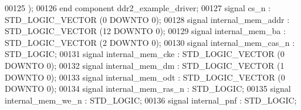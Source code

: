 \begin{DoxyCode}
{00125       );
00126   \textcolor{keywordflow}{end} \textcolor{keywordflow}{component} \textcolor{vhdlchar}{ddr2_example_driver};
00127                 \textcolor{keywordflow}{signal} \textcolor{vhdlchar}{cs_n} \textcolor{vhdlchar}{:}  \textcolor{comment}{STD\_LOGIC\_VECTOR} \textcolor{vhdlchar}{(}\textcolor{vhdllogic}{}\textcolor{vhdllogic}{0} \textcolor{keywordflow}{DOWNTO} \textcolor{vhdllogic}{}\textcolor{vhdllogic}{0}\textcolor{vhdlchar}{)};
00128                 \textcolor{keywordflow}{signal} \textcolor{vhdlchar}{internal_mem_addr} \textcolor{vhdlchar}{:}  \textcolor{comment}{STD\_LOGIC\_VECTOR} \textcolor{vhdlchar}{(}\textcolor{vhdllogic}{}\textcolor{vhdllogic}{12} \textcolor{keywordflow}{DOWNTO} \textcolor{vhdllogic}{}\textcolor{vhdllogic}{0}\textcolor{vhdlchar}{)};
00129                 \textcolor{keywordflow}{signal} \textcolor{vhdlchar}{internal_mem_ba} \textcolor{vhdlchar}{:}  \textcolor{comment}{STD\_LOGIC\_VECTOR} \textcolor{vhdlchar}{(}\textcolor{vhdllogic}{}\textcolor{vhdllogic}{2} \textcolor{keywordflow}{DOWNTO} \textcolor{vhdllogic}{}\textcolor{vhdllogic}{0}\textcolor{vhdlchar}{)};
00130                 \textcolor{keywordflow}{signal} \textcolor{vhdlchar}{internal_mem_cas_n} \textcolor{vhdlchar}{:}  \textcolor{comment}{STD\_LOGIC};
00131                 \textcolor{keywordflow}{signal} \textcolor{vhdlchar}{internal_mem_cke} \textcolor{vhdlchar}{:}  \textcolor{comment}{STD\_LOGIC\_VECTOR} \textcolor{vhdlchar}{(}\textcolor{vhdllogic}{}\textcolor{vhdllogic}{0} \textcolor{keywordflow}{DOWNTO} \textcolor{vhdllogic}{}\textcolor{vhdllogic}{0}\textcolor{vhdlchar}{)};
00132                 \textcolor{keywordflow}{signal} \textcolor{vhdlchar}{internal_mem_dm} \textcolor{vhdlchar}{:}  \textcolor{comment}{STD\_LOGIC\_VECTOR} \textcolor{vhdlchar}{(}\textcolor{vhdllogic}{}\textcolor{vhdllogic}{1} \textcolor{keywordflow}{DOWNTO} \textcolor{vhdllogic}{}\textcolor{vhdllogic}{0}\textcolor{vhdlchar}{)};
00133                 \textcolor{keywordflow}{signal} \textcolor{vhdlchar}{internal_mem_odt} \textcolor{vhdlchar}{:}  \textcolor{comment}{STD\_LOGIC\_VECTOR} \textcolor{vhdlchar}{(}\textcolor{vhdllogic}{}\textcolor{vhdllogic}{0} \textcolor{keywordflow}{DOWNTO} \textcolor{vhdllogic}{}\textcolor{vhdllogic}{0}\textcolor{vhdlchar}{)};
00134                 \textcolor{keywordflow}{signal} \textcolor{vhdlchar}{internal_mem_ras_n} \textcolor{vhdlchar}{:}  \textcolor{comment}{STD\_LOGIC};
00135                 \textcolor{keywordflow}{signal} \textcolor{vhdlchar}{internal_mem_we_n} \textcolor{vhdlchar}{:}  \textcolor{comment}{STD\_LOGIC};
00136                 \textcolor{keywordflow}{signal} \textcolor{vhdlchar}{internal_pnf} \textcolor{vhdlchar}{:}  \textcolor{comment}{STD\_LOGIC};
}
\end{DoxyCode}
